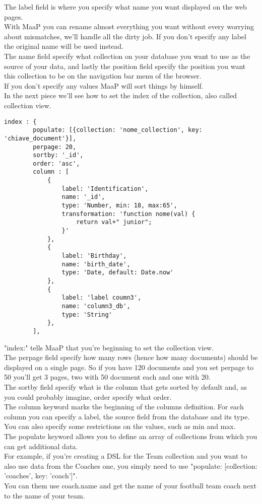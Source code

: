 The label field is where you specify what name you want displayed on the web pages.\\
With MaaP you can rename almost everything you want without every worrying about mismatches, we'll handle all the dirty job.
If you don't specify any label the original name will be used instead.\\
The name field specify what collection on your database you want to use as the source of your data, and lastly the position field specify the position you want this collection to be on the navigation bar menu of the browser.\\
If you don't specify any values MaaP will sort things by himself.\\

In the next piece we'll see how to set the index of the collection, also called collection view.\\

\begin{lstlisting}
index : {
		populate: [{collection: 'nome_collection', key: 'chiave_document'}],
		perpage: 20,
		sortby: '_id',
		order: 'asc',
		column : [
			{
				label: 'Identification',
				name: '_id',
				type: 'Number, min: 18, max:65',
				transformation: 'function nome(val) { 	
					return val+" junior";				
				}'
			},
			{	
				label: 'Birthday',
				name: 'birth_date',
				type: 'Date, default: Date.now'
			},
			{	
				label: 'label coumn3',
				name: 'column3_db',
				type: 'String'
			},
		],
\end{lstlisting}

"index:" tells MaaP that you're beginning to set the collection view.\\
The perpage field specify how many rows (hence how many documents) should be displayed on a single page. So if you have 120 documents and you set perpage to 50 you'll get 3 pages, two with 50 document each and one with 20.\\
The sortby field specify what is the column that gets sorted by default and, as you could probably imagine, order specify what order.\\

The column keyword marks the beginning of the columns definition.
For each column you can specify a label, the source field from the database and its type.
You can also specify some restrictions on the values, such as min and max.\\

The populate keyword allows you to define an array of collections from which you can get additional data.\\
For example, if you're creating a DSL for the Team collection and you want to also use data from the Coaches one, you simply need to use "populate: [{collection: 'coaches', key: 'coach'}]".\\
You can them use coach.name and get the name of your football team coach next to the name of your team.


